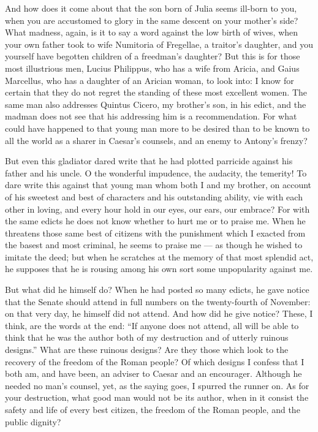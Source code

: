  And how does it come about that the son born of Julia seems ill-born to you, when you are accustomed to glory in the same descent on your mother's side? What madness, again, is it to say a word against the low birth of wives, when your own father took to wife Numitoria of Fregellae, a traitor's daughter, and you yourself have begotten children of a freedman's daughter? But this is for those most illustrious men, Lucius Philippus, who has a wife from Aricia, and Gaius Marcellus, who has a daughter of an Arician woman, to look into: I know for certain that they do not regret the standing of these most excellent women. The same man also addresses Quintus Cicero, my brother's son, in his edict, and the madman does not see that his addressing him is a recommendation. For what could have happened to that young man more to be desired than to be known to all the world as a sharer in Caesar's counsels, and an enemy to Antony's frenzy?

 But even this gladiator dared write that he had plotted parricide against his father and his uncle. O the wonderful impudence, the audacity, the temerity! To dare write this against that young man whom both I and my brother, on account of his sweetest and best of characters and his outstanding ability, vie with each other in loving, and every hour hold in our eyes, our ears, our embrace? For with the same edicts he does not know whether to hurt me or to praise me. When he threatens those same best of citizens with the punishment which I exacted from the basest and most criminal, he seems to praise me --- as though he wished to imitate the deed; but when he scratches at the memory of that most splendid act, he supposes that he is rousing among his own sort some unpopularity against me.

 But what did he himself do? When he had posted so many edicts, he gave notice that the Senate should attend in full numbers on the twenty-fourth of November: on that very day, he himself did not attend. And how did he give notice? These, I think, are the words at the end: ``If anyone does not attend, all will be able to think that he was the author both of my destruction and of utterly ruinous designs.'' What are these ruinous designs? Are they those which look to the recovery of the freedom of the Roman people? Of which designs I confess that I both am, and have been, an adviser to Caesar and an encourager. Although he needed no man's counsel, yet, as the saying goes, I spurred the runner on. As for your destruction, what good man would not be its author, when in it consist the safety and life of every best citizen, the freedom of the Roman people, and the public dignity?

